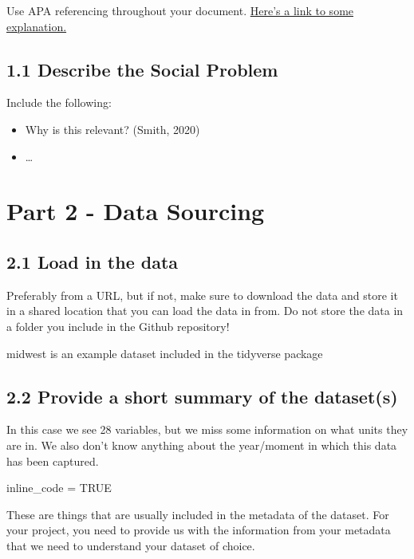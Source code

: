 \documentclass[
]{article}
\newenvironment{Shaded}{\begin{snugshade}}{\end{snugshade}}
\newcommand{\ConstantTok}[1]{\textcolor[rgb]{0.56,0.35,0.01}{#1}}
\newcommand{\NormalTok}[1]{#1}
\newcommand{\OtherTok}[1]{\textcolor[rgb]{0.56,0.35,0.01}{#1}}
\begin{document}
Use APA referencing throughout your document.
\href{https://www.mendeley.com/guides/apa-citation-guide/}{Here's a link
to some explanation.}

\subsection{1.1 Describe the Social
Problem}\label{describe-the-social-problem}

Include the following:

\begin{itemize}
\item
  Why is this relevant? (Smith, 2020)
\item
  \ldots{}
\end{itemize}

\section{Part 2 - Data Sourcing}\label{part-2---data-sourcing}

\subsection{2.1 Load in the data}\label{load-in-the-data}

Preferably from a URL, but if not, make sure to download the data and
store it in a shared location that you can load the data in from. Do not
store the data in a folder you include in the Github repository!

midwest is an example dataset included in the tidyverse package

\subsection{2.2 Provide a short summary of the
dataset(s)}\label{provide-a-short-summary-of-the-datasets}

In this case we see 28 variables, but we miss some information on what
units they are in. We also don't know anything about the year/moment in
which this data has been captured.

\begin{Shaded}
\begin{Highlighting}[]
\NormalTok{inline\_code }\OtherTok{=} \ConstantTok{TRUE}
\end{Highlighting}
\end{Shaded}

These are things that are usually included in the metadata of the
dataset. For your project, you need to provide us with the information
from your metadata that we need to understand your dataset of choice.
\end{document}

